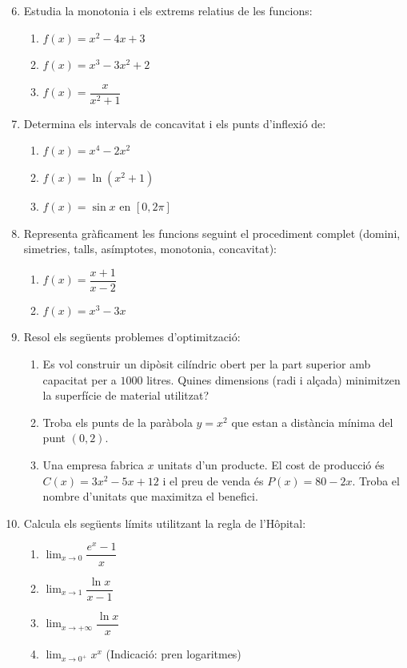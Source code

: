 \documentclass[12pt]{article}
\begin{document}
\begin{enumerate}[label=\arabic*.]
    \setcounter{enumi}{5}
    \item Estudia la monotonia i els extrems relatius de les funcions:
    \begin{enumerate}[label=\alph*)]
        \item $f(x)=x^2-4x+3$
        \item $f(x)=x^3-3x^2+2$
        \item $f(x)=\dfrac{x}{x^2+1}$
    \end{enumerate}

    \item Determina els intervals de concavitat i els punts d'inflexió de:
    \begin{enumerate}[label=\alph*)]
        \item $f(x)=x^4-2x^2$
        \item $f(x)=\ln(x^2+1)$
        \item $f(x)=\sin x$ en $[0,2\pi]$
    \end{enumerate}

    \item Representa gràficament les funcions seguint el procediment complet (domini, simetries, talls, asímptotes, monotonia, concavitat):
    \begin{enumerate}[label=\alph*)]
        \item $f(x)=\dfrac{x+1}{x-2}$
        \item $f(x)=x^3-3x$
    \end{enumerate}

    \item Resol els següents problemes d'optimització:
    \begin{enumerate}[label=\alph*)]
        \item Es vol construir un dipòsit cilíndric obert per la part superior amb capacitat per a $1000$ litres. Quines dimensions (radi i alçada) minimitzen la superfície de material utilitzat?
        \item Troba els punts de la paràbola $y=x^2$ que estan a distància mínima del punt $(0,2)$.
        \item Una empresa fabrica $x$ unitats d'un producte. El cost de producció és $C(x)=3x^2-5x+12$ i el preu de venda és $P(x)=80-2x$. Troba el nombre d'unitats que maximitza el benefici.
    \end{enumerate}

    \item Calcula els següents límits utilitzant la regla de l'Hôpital:
    \begin{enumerate}[label=\alph*)]
        \item $\displaystyle \lim_{x\to 0} \dfrac{e^x-1}{x}$
        \item $\displaystyle \lim_{x\to 1} \dfrac{\ln x}{x-1}$
        \item $\displaystyle \lim_{x\to +\infty} \dfrac{\ln x}{x}$
        \item $\displaystyle \lim_{x\to 0^+} x^x$ (Indicació: pren logaritmes)
    \end{enumerate}
\end{enumerate}
\end{document}
